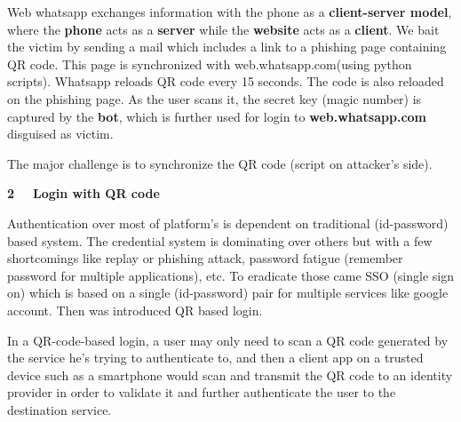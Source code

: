 \documentclass[12pt]{article}
\renewcommand{\_}{\kern-1.5pt\textunderscore\kern-1.5pt}
\begin{document}
\begin{FlushLeft}
Web whatsapp exchanges information with the phone as a \textbf{client-server model}, where the \textbf{phone} acts as a \textbf{server} while the \textbf{website }acts\textbf{ }as a \textbf{client}. We bait the victim by sending a mail which includes a link to a phishing page containing QR code. This page is synchronized with web.whatsapp.com(using python scripts). Whatsapp reloads QR code every 15 seconds. The code is also reloaded on the phishing page. As the user scans it, the secret key (magic number) is captured by the \textbf{bot}, which is further used for login to \textbf{web.whatsapp.com} disguised as victim. 
\end{FlushLeft}\par

\begin{FlushLeft}
The major challenge is to synchronize the QR code (script on attacker’s side).
\end{FlushLeft}\par


\vspace{\baselineskip}
\begin{FlushLeft}
{\fontsize{18pt}{21.6pt}\selectfont \textbf{2}\ \ \  \textbf{Login with QR code}\par}
\end{FlushLeft}\par

\begin{FlushLeft}
Authentication over most of platform’s is dependent on traditional (id-password) based system. The credential system is dominating over others but with a few shortcomings like replay or phishing attack, password fatigue (remember password for multiple applications), etc. To eradicate those came SSO (single sign on) which is based on a single (id-password) pair for multiple services like google account. Then was introduced QR based login.
\end{FlushLeft}\par

\begin{FlushLeft}
\textcolor[HTML]{24292E}{In a QR-code-based login, a user may only need to scan a QR code generated by the service he’s trying to authenticate to, and then a client app on a trusted device such as a smartphone would scan and transmit the QR code to an identity provider in order to validate it and further authenticate the user to the destination service. }
\end{FlushLeft}\par
\end{document}
